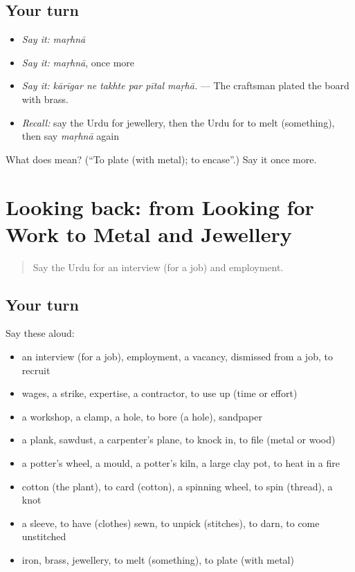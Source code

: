 \subsection*{Your turn}
\begin{itemize}
\raggedright
  \item \emph{Say it:} \emph{maṛhnā}
  \item \emph{Say it:} \emph{maṛhnā}, once more
  \item \emph{Say it:} \emph{kārīgar ne takhte par pītal maṛhā.} — The craftsman plated the board with brass.
  \item \emph{Recall:} say the Urdu for jewellery, then the Urdu for to melt (something), then say \emph{maṛhnā} again
\end{itemize}

\begin{tcolorbox}[breakable,colback=teal!4,colframe=teal!35!black,title={Before you move on}]
What does  mean? (\textquotedblleft{}To plate (with metal); to encase\textquotedblright{}.) Say it once more.
\end{tcolorbox}
\section[(dialogue)]{Looking back: from Looking for Work to Metal and Jewellery}

\label{lesson:UR-R501-review-494-501}



\begin{quote}
Say the Urdu for an interview (for a job) and employment.
\end{quote}

\subsection*{Your turn}
Say these aloud:

\begin{itemize}
\raggedright
  \item an interview (for a job), employment, a vacancy, dismissed from a job, to recruit
  \item wages, a strike, expertise, a contractor, to use up (time or effort)
  \item a workshop, a clamp, a hole, to bore (a hole), sandpaper
  \item a plank, sawdust, a carpenter's plane, to knock in, to file (metal or wood)
  \item a potter's wheel, a mould, a potter's kiln, a large clay pot, to heat in a fire
  \item cotton (the plant), to card (cotton), a spinning wheel, to spin (thread), a knot
  \item a sleeve, to have (clothes) sewn, to unpick (stitches), to darn, to come unstitched
  \item iron, brass, jewellery, to melt (something), to plate (with metal)
\end{itemize}

